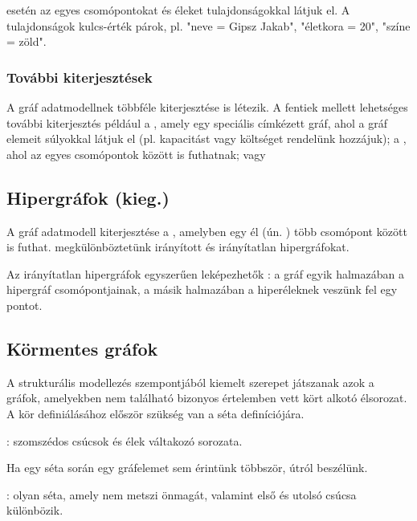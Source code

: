  esetén az egyes csomópontokat és éleket tulajdonságokkal látjuk el. A tulajdonságok kulcs-érték párok, pl. "neve = Gipsz Jakab", "életkora = 20", "színe = zöld".

\subsubsection{További kiterjesztések}

A gráf adatmodellnek többféle kiterjesztése is létezik. A fentiek mellett lehetséges további kiterjesztés például a , amely egy speciális címkézett gráf, ahol a gráf elemeit súlyokkal látjuk el (pl. kapacitást vagy költséget rendelünk hozzájuk); a , ahol az egyes csomópontok között  is futhatnak; vagy 

\subsection{Hipergráfok (kieg.)}

A gráf adatmodell kiterjesztése a , amelyben egy él (ún. ) több csomópont között is futhat. megkülönböztetünk irányított és irányítatlan hipergráfokat.

Az irányítatlan hipergráfok egyszerűen leképezhetők : a gráf egyik halmazában a hipergráf csomópontjainak, a másik halmazában a hiperéleknek veszünk fel egy pontot.



\subsection{Körmentes gráfok}

A strukturális modellezés szempontjából kiemelt szerepet játszanak azok a gráfok, amelyekben nem található bizonyos értelemben vett kört alkotó élsorozat. A kör definiálásához először szükség van a séta definíciójára.

\begin{definicio}
	: szomszédos csúcsok és élek váltakozó sorozata.
\end{definicio}

Ha egy séta során egy gráfelemet sem érintünk többször, útról beszélünk.

\begin{definicio}
: olyan séta, amely nem metszi önmagát, valamint első és utolsó csúcsa különbözik.
\end{definicio}

